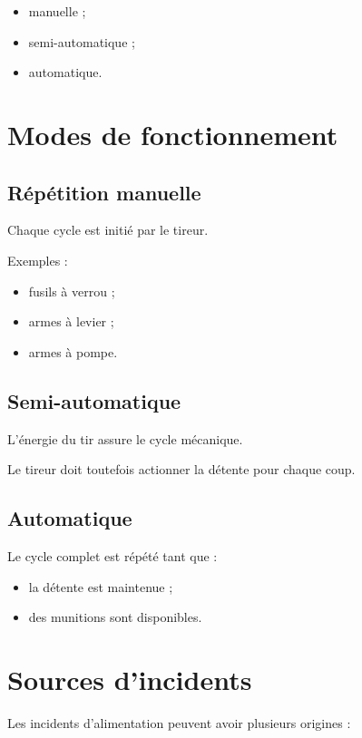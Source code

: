 \begin{itemize}
    \item manuelle ;
    \item semi-automatique ;
    \item automatique.
\end{itemize}

\section{Modes de fonctionnement}

\subsection{Répétition manuelle}

Chaque cycle est initié par le tireur.

Exemples :

\begin{itemize}
    \item fusils à verrou ;
    \item armes à levier ;
    \item armes à pompe.
\end{itemize}

\subsection{Semi-automatique}

L'énergie du tir assure le cycle mécanique.

Le tireur doit toutefois actionner la détente pour chaque coup.

\subsection{Automatique}

Le cycle complet est répété tant que :

\begin{itemize}
    \item la détente est maintenue ;
    \item des munitions sont disponibles.
\end{itemize}

\section{Sources d'incidents}

Les incidents d'alimentation peuvent avoir plusieurs origines :

